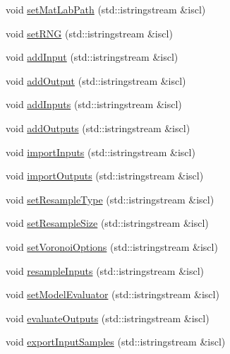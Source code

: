\begin{DoxyCompactItemize}
\item 
void \hyperlink{class_go_s_u_m_1_1_c_script_a1b06f62a9c08397c1a36e68650d4a34f}{set\-Mat\-Lab\-Path} (std\-::istringstream \&iscl)
\item 
void \hyperlink{class_go_s_u_m_1_1_c_script_a85b28212a2bfa185eaa6f84bd6cf998f}{set\-R\-N\-G} (std\-::istringstream \&iscl)
\item 
void \hyperlink{class_go_s_u_m_1_1_c_script_ad652f2ffb2f8779c205f6d82c3b2338e}{add\-Input} (std\-::istringstream \&iscl)
\item 
void \hyperlink{class_go_s_u_m_1_1_c_script_a7f4fd8f930d9b6c40285dc673deab819}{add\-Output} (std\-::istringstream \&iscl)
\item 
void \hyperlink{class_go_s_u_m_1_1_c_script_a84ac1047a5e9a374d837ba5540efb1f2}{add\-Inputs} (std\-::istringstream \&iscl)
\item 
void \hyperlink{class_go_s_u_m_1_1_c_script_a1eeff9fb12a8fde4b6c727bb4d1b86ad}{add\-Outputs} (std\-::istringstream \&iscl)
\item 
void \hyperlink{class_go_s_u_m_1_1_c_script_adca98aa2c216382d0ec75e0c1393947f}{import\-Inputs} (std\-::istringstream \&iscl)
\item 
void \hyperlink{class_go_s_u_m_1_1_c_script_a03f578d1c59b2bd261a1f287d46fcbd2}{import\-Outputs} (std\-::istringstream \&iscl)
\item 
void \hyperlink{class_go_s_u_m_1_1_c_script_ad5cc96be544d7e558e54f8dc08cff1b1}{set\-Resample\-Type} (std\-::istringstream \&iscl)
\item 
void \hyperlink{class_go_s_u_m_1_1_c_script_a100a80b2c82847007e9272de5d27fb51}{set\-Resample\-Size} (std\-::istringstream \&iscl)
\item 
void \hyperlink{class_go_s_u_m_1_1_c_script_a049fdf49e87f6e0ab4057999ee9962cd}{set\-Voronoi\-Options} (std\-::istringstream \&iscl)
\item 
void \hyperlink{class_go_s_u_m_1_1_c_script_a828b553795cc1bec6ae7962a0cd50b86}{resample\-Inputs} (std\-::istringstream \&iscl)
\item 
void \hyperlink{class_go_s_u_m_1_1_c_script_a918cf422ed0a4e4e3b293282803a7b33}{set\-Model\-Evaluator} (std\-::istringstream \&iscl)
\item 
void \hyperlink{class_go_s_u_m_1_1_c_script_a8ff5f382c99fb261be9c0abaf21c0cba}{evaluate\-Outputs} (std\-::istringstream \&iscl)
\item 
void \hyperlink{class_go_s_u_m_1_1_c_script_a1dc461afd2bf5a4bb296a2fe0aaed768}{export\-Input\-Samples} (std\-::istringstream \&iscl)

\end{DoxyCompactItemize}
